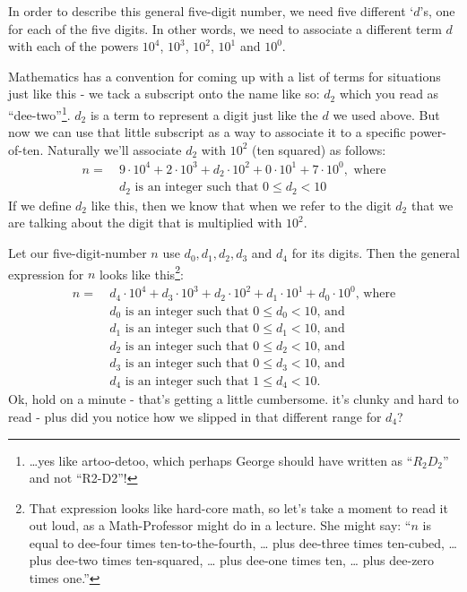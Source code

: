 \documentclass{article}
\begin{document}
In order to describe this general five-digit number, we need
five different `$d$'s, one for each of the five digits.
In other words, we need to associate a different term $d$ with each of the powers
$10^4$, $10^3$, $10^2$, $10^1$ and $10^0$.

Mathematics has a convention for coming up with
a list of terms for situations just like this -
we tack a subscript onto the name like so: $d_2$ which
you read as ``dee-two''\footnote{\dots{}yes like artoo-detoo, which perhaps
George should have written as ``$R_2D_2$'' and not ``R2-D2''!}.
$d_2$ is a term to represent a digit just like the $d$ we used above.
But now we can use that little subscript as a way to
associate it to a specific power-of-ten.
Naturally we'll associate $d_2$ with $10^2$ (ten squared) as follows:
\begin{align*}
n =\ &9{\cdot}10^4+2{\cdot}10^3+d_2{\cdot}10^2+0{\cdot}10^1+7{\cdot}10^0,\text{ where}\\
&d_2\text{ is an integer such that }0\le{}d_2<10
\end{align*}
If we define $d_2$ like this, then we know that when we refer to the digit $d_2$
that we are talking about the digit that is multiplied with $10^2$.

\break
Let our five-digit-number $n$ use $d_0,d_1,d_2,d_3$ and $d_4$ for its digits. Then
the general expression for $n$ looks like this\footnote{That expression looks like
hard-core math, so let's take a moment
to read it out loud, as a Math-Professor might do in a lecture.  She might say:
``$n$ is equal to dee-four times ten-to-the-fourth, \dots{}
plus dee-three times ten-cubed, \dots{} plus dee-two times ten-squared,
  \dots{} plus dee-one times ten,  \dots{} plus dee-zero times one.''}:
\begin{align*}
n =\ &d_4{\cdot}10^4+d_3{\cdot}10^3+d_2{\cdot}10^2+d_1{\cdot}10^1+d_0{\cdot}10^0\text{, where}\\
& d_0\text{ is an integer such that }0\le{}d_0<10\text{, and}\\
& d_1\text{ is an integer such that }0\le{}d_1<10\text{, and}\\
& d_2\text{ is an integer such that }0\le{}d_2<10\text{, and}\\
& d_3\text{ is an integer such that }0\le{}d_3<10\text{, and}\\
& d_4\text{ is an integer such that }1\le{}d_4<10.
\end{align*}
Ok, hold on a minute - that's getting a little cumbersome. it's clunky and hard to read -
plus did  you notice how we slipped in that different range for $d_4$?
\end{document}
